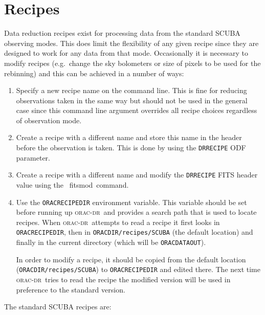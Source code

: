 \documentclass[twoside,11pt]{article}
\newcommand{\xref}[3]{#1}
\newcommand{\xlabel}[1]{}
\renewcommand{\_}{\texttt{\symbol{95}}}
\newcommand{\oracdr}{\xref{\textsc{orac-dr}}{sun230}{}}
\newcommand{\task}[1]{{\textsf{#1}}}
\newcommand{\Kappa}{\xref{{\sc{Kappa}}}{sun95}{}}
\newcommand{\fitsmod}{\xref{\task{fitsmod}}{sun95}{FITSMOD}}
\begin{document}
\section{Recipes\xlabel{recipes}}

Data reduction recipes exist for processing data from the standard SCUBA
observing modes. This does limit the flexibility of any given recipe since
they are designed to work for any data from that mode. Occasionally it is
necessary to modify recipes (e.g.\ change the sky bolometers or size of pixels to
be used for the rebinning) and this can be achieved in a number of ways:

\begin{enumerate}

\item Specify a new recipe name on the command line. This is fine
for reducing observations taken in the same way but should not be used
in the general case since this command line argument overrides all 
recipe choices regardless of observation mode.

\item Create a recipe with a different name and store this name
in the header before the observation is taken. This is done by using 
the \texttt{DRRECIPE} ODF parameter.

\item Create a recipe with a different name and modify the \texttt{DRRECIPE}
FITS header value using the \Kappa\ \fitsmod\ command.


\item Use the \texttt{ORAC\_RECIPE\_DIR} environment variable. This variable
should be set before running up \oracdr\ and provides a search path that is
used to locate recipes. When \oracdr\ attempts to read a recipe it first looks
in \texttt{ORAC\_RECIPE\_DIR}, then in \texttt{ORAC\_DIR/recipes/SCUBA} (the
default location) and finally in the current directory (which will be
\texttt{ORAC\_DATA\_OUT}).

In order to modify a recipe, it should be copied from the default location
(\texttt{ORAC\_DIR/recipes/SCUBA}) to \texttt{ORAC\_RECIPE\_DIR} and edited there. The next
time \oracdr\ tries to read the recipe the modified version will be used
in preference to the standard version.

\end{enumerate}

The standard SCUBA recipes are:
\end{document}
